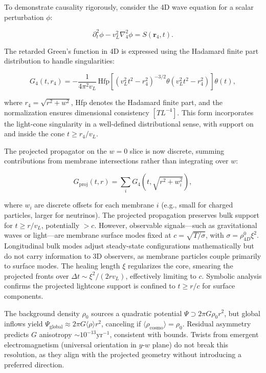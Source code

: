 To demonstrate causality rigorously, consider the 4D wave equation for a scalar perturbation $\phi$:

\[
\partial_t^2 \phi - v_L^2 \nabla_4^2 \phi = S(\mathbf{r}_4, t).
\]

The retarded Green's function in 4D is expressed using the Hadamard finite part distribution to handle singularities:

\[
G_4(t, r_4) = -\frac{1}{4 \pi^2 v_L} \, \text{Hfp} \left[ (v_L^2 t^2 - r_4^2)^{-3/2} \theta(v_L^2 t^2 - r_4^2) \right] \theta(t),
\]

where $r_4 = \sqrt{r^2 + w^2}$, Hfp denotes the Hadamard finite part, and the normalization ensures dimensional consistency $[T L^{-4}]$. This form incorporates the light-cone singularity in a well-defined distributional sense, with support on and inside the cone $t \geq r_4 / v_L$.

The projected propagator on the $w=0$ slice is now discrete, summing contributions from membrane intersections rather than integrating over $w$:

\[
G_{\text{proj}}(t, r) = \sum_i G_4(t, \sqrt{r^2 + w_i^2}),
\]

where $w_i$ are discrete offsets for each membrane $i$ (e.g., small for charged particles, larger for neutrinos). The projected propagation preserves bulk support for $t \geq r / v_L$, potentially $>c$. However, observable signals---such as gravitational waves or light---are membrane surface modes fixed at $c = \sqrt{T / \sigma}$, with $\sigma = \rho_{4D}^0 \xi^2$. Longitudinal bulk modes adjust steady-state configurations mathematically but do not carry information to 3D observers, as membrane particles couple primarily to surface modes. The healing length $\xi$ regularizes the core, smearing the projected fronts over $\Delta t \sim \xi^2 / (2 r v_L)$, effectively limiting to $c$. Symbolic analysis confirms the projected lightcone support is confined to $t \geq r / c$ for surface components.

The background density $\rho_0$ sources a quadratic potential $\Psi \supset 2\pi G \rho_0 r^2$, but global inflows yield $\Psi_{\text{global}} \approx 2\pi G \langle \rho \rangle r^2$, canceling if $\langle \rho_{\text{cosmo}} \rangle = \rho_0$. Residual asymmetry predicts $G$ anisotropy $\sim 10^{-13} \text{yr}^{-1}$, consistent with bounds. Twists from emergent electromagnetism (universal orientation in $y$-$w$ plane) do not break this resolution, as they align with the projected geometry without introducing a preferred direction.

